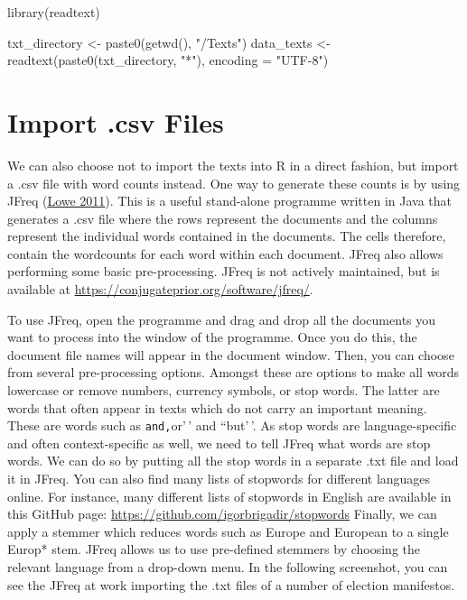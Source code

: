 \documentclass[
]{book}
\newenvironment{Shaded}{\begin{snugshade}}{\end{snugshade}}
\newcommand{\AttributeTok}[1]{\textcolor[rgb]{0.77,0.63,0.00}{#1}}
\newcommand{\FunctionTok}[1]{\textcolor[rgb]{0.00,0.00,0.00}{#1}}
\newcommand{\NormalTok}[1]{#1}
\newcommand{\OtherTok}[1]{\textcolor[rgb]{0.56,0.35,0.01}{#1}}
\newcommand{\StringTok}[1]{\textcolor[rgb]{0.31,0.60,0.02}{#1}}
\begin{document}
\begin{Shaded}
\begin{Highlighting}[]
\FunctionTok{library}\NormalTok{(readtext)}

\NormalTok{txt\_directory }\OtherTok{\textless{}{-}} \FunctionTok{paste0}\NormalTok{(}\FunctionTok{getwd}\NormalTok{(), }\StringTok{"/Texts"}\NormalTok{)}
\NormalTok{data\_texts }\OtherTok{\textless{}{-}} \FunctionTok{readtext}\NormalTok{(}\FunctionTok{paste0}\NormalTok{(txt\_directory, }\StringTok{"*"}\NormalTok{), }\AttributeTok{encoding =} \StringTok{"UTF{-}8"}\NormalTok{)}
\end{Highlighting}
\end{Shaded}

\hypertarget{import-.csv-files}{%
\section{Import .csv Files}\label{import-.csv-files}}

We can also choose not to import the texts into R in a direct fashion, but import a .csv file with word counts instead. One way to generate these counts is by using JFreq (\protect\hyperlink{ref-Lowe2011b}{Lowe 2011}). This is a useful stand-alone programme written in Java that generates a .csv file where the rows represent the documents and the columns represent the individual words contained in the documents. The cells therefore, contain the wordcounts for each word within each document. JFreq also allows performing some basic pre-processing. JFreq is not actively maintained, but is available at \url{https://conjugateprior.org/software/jfreq/}.

To use JFreq, open the programme and drag and drop all the documents you want to process into the window of the programme. Once you do this, the document file names will appear in the document window. Then, you can choose from several pre-processing options. Amongst these are options to make all words lowercase or remove numbers, currency symbols, or stop words. The latter are words that often appear in texts which do not carry an important meaning. These are words such as \texttt{and\textquotesingle{}\textquotesingle{},}or'\,' and ``but'\,'. As stop words are language-specific and often context-specific as well, we need to tell JFreq what words are stop words. We can do so by putting all the stop words in a separate .txt file and load it in JFreq. You can also find many lists of stopwords for different languages online. For instance, many different lists of stopwords in English are available in this GitHub page: \url{https://github.com/igorbrigadir/stopwords} Finally, we can apply a stemmer which reduces words such as Europe and European to a single Europ* stem. JFreq allows us to use pre-defined stemmers by choosing the relevant language from a drop-down menu. In the following screenshot, you can see the JFreq at work importing the .txt files of a number of election manifestos.
\end{document}
